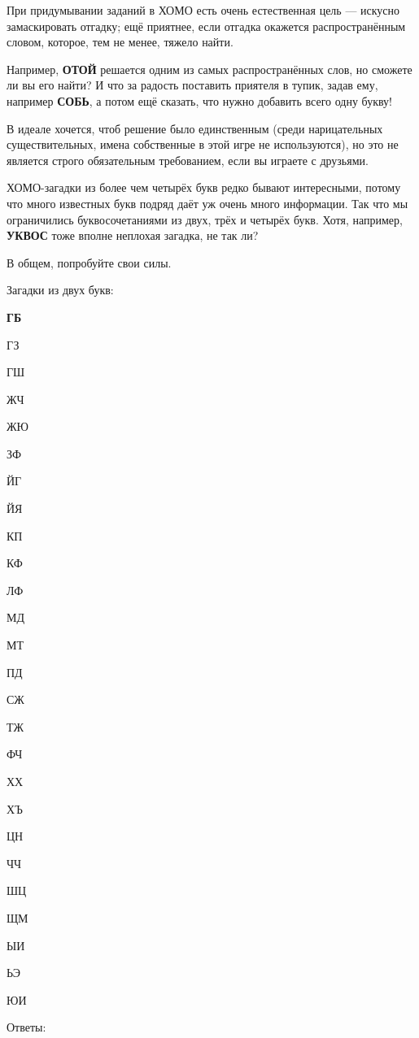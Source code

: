 При придумывании заданий в ХОМО есть очень естественная цель --- искусно замаскировать отгадку;
ещё приятнее, если отгадка окажется распространённым словом, которое, тем не менее, тяжело найти. 

Например, \textbf{ОТОЙ} решается одним из самых распространённых слов, но сможете ли вы его найти?
И что за радость поставить приятеля в тупик, задав ему, например \textbf{СОБЬ}, а потом ещё сказать, что нужно добавить всего одну букву!

В идеале хочется, чтоб решение было единственным (среди нарицательных существительных, имена собственные в этой игре не используются), но это не является строго обязательным требованием, если вы играете с друзьями.

ХОМО-загадки из более чем четырёх букв редко бывают интересными, потому что много известных букв подряд даёт уж очень много информации.
Так что мы ограничились буквосочетаниями из двух, трёх и четырёх букв.
Хотя, например, \textbf{УКВОС} тоже вполне неплохая загадка, не так ли?

В общем, попробуйте свои силы.

Загадки из двух букв:

\begin{multicols}{4}
{\bf
ГБ

ГЗ

ГШ

ЖЧ

ЖЮ

ЗФ

ЙГ

ЙЯ

КП

КФ

ЛФ

МД

МТ

ПД

СЖ

ТЖ

ФЧ

ХХ

ХЪ

ЦН

ЧЧ

ШЦ

ЩМ

ЫИ

ЬЭ

ЮИ
}
\end{multicols}

Ответы:

